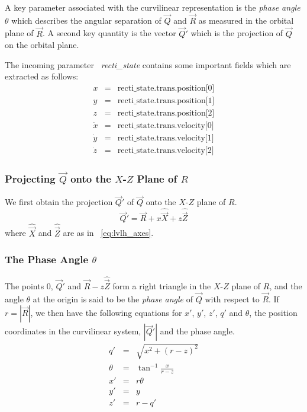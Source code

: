 A key parameter associated with the curvilinear representation is the
\emph{phase angle} $\theta$ which
describes the angular separation of $\vec Q$ and $\vec R$ as measured in
the orbital plane of $\vec R$. A second key
quantity is the vector $\vec Q'$ which is the projection of $\vec Q$ on the
orbital plane.

The incoming parameter \textit{~recti\_state} contains some important fields
which are extracted as follows:
\begin{eqnarray}
x & = & \mbox{recti\_state.trans.position[0]} \\ \nonumber
y & = & \mbox{recti\_state.trans.position[1]} \\ \nonumber
z & = & \mbox{recti\_state.trans.position[2]} \\ \nonumber
\dot x & = & \mbox{recti\_state.trans.velocity[0]} \\ \nonumber
\dot y & = & \mbox{recti\_state.trans.velocity[1]} \\ \nonumber
\dot z & = & \mbox{recti\_state.trans.velocity[2]}
\label{eq:recti_state}
\end{eqnarray}

\subsubsection{Projecting $\vec Q$ onto the $X$-$Z$ Plane of $R$}
We first obtain the projection $\vec Q'$ of $\vec Q$ onto the $X$-$Z$ plane
of $R$. 
\begin{equation}
\vec Q' = \vec R + x\hat{\vec{X}} + z\hat{\vec{Z}}
\label{eq:QPrime}
\end{equation}
\noindent where $\hat{\vec{X}}$ and $\hat{\vec{Z}}$ are as in ~\ref{eq:lvlh_axes}.

\subsubsection {The Phase Angle $\theta$}
The points $0$, $\vec Q'$ and $\vec R - z\hat{\vec{Z}}$ form a right triangle in
the $X$-$Z$ plane of $R$, and the angle $\theta$ at the origin is said to be
the \emph{phase angle} of $\vec Q$ with respect to $\vec R$.
If $r=|\vec R|$, we then have the following equations for $x'$, $y'$, $z'$, $q'$ and
$\theta$, the position coordinates in the curvilinear system, $|\vec Q'|$ and
the phase angle.
\begin{eqnarray}
q' & = & \sqrt {x^2 + (r-z)^2} \\ \nonumber
\theta & = & \tan^{-1} \frac{x}{r-z} \\ \nonumber
x' & = & r\theta \\ \nonumber
y' & = & y \\ \nonumber
z' & = & r-q'
\label{eq:curvi_position}
\end{eqnarray}

